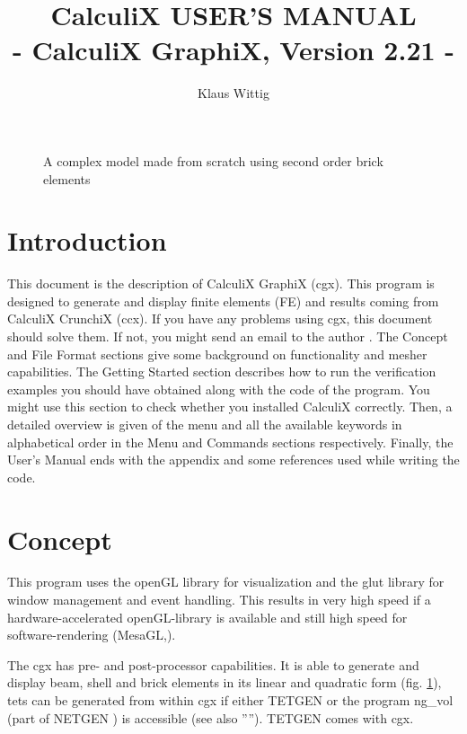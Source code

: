 \documentclass{article}
\begin{document}
\title{CalculiX USER'S MANUAL\\ - CalculiX GraphiX, Version 2.21 -}
\author{Klaus Wittig}
\maketitle
\begin{figure}[h]
\caption{\label{cover} A complex model made from scratch using second order brick elements }
\end{figure}
\newpage


\tableofcontents


\section{Introduction}
 This document is the description of CalculiX GraphiX (cgx). This program is designed to generate and display finite elements (FE) and results coming from CalculiX CrunchiX (ccx). If you have any problems using cgx, this document should solve them. If not, you might send an email to the author \cite{cgx}. The Concept and File Format sections give some background on functionality and mesher capabilities. The Getting Started section describes how to run the verification examples you should have obtained along with the code of the program. You might use this section to check whether you installed CalculiX correctly. Then, a detailed overview is given of the menu and all the available keywords in alphabetical order in the Menu and Commands sections respectively. Finally, the User's Manual ends with the appendix and some references used while writing the code.


\section{Concept}
This program uses the openGL library for visualization and the glut library \cite{glut} for window management and event handling. This results in very high speed if a hardware-accelerated openGL-library is available and still high speed for software-rendering (MesaGL,\cite{mesa}). 

The cgx has pre- and post-processor capabilities. It is able to generate and display beam, shell and brick elements in its linear and quadratic form (fig. \ref{cover}), tets can be generated from within cgx if either TETGEN \cite{TETGEN} or the program ng\_vol (part of NETGEN \cite{NETGEN}) is accessible (see also ''''). TETGEN comes with cgx.
\end{document}
